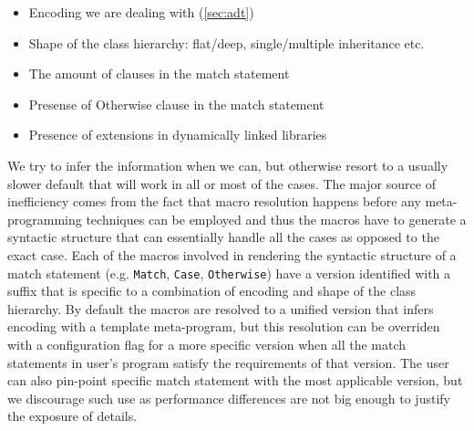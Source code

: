 \documentclass[preprint]{sigplanconf}
\makeatletter
\DeclareRobustCommand{\code}[1]{{\lstinline[breaklines=false,escapechar=@]{#1}}}
\makeatother
\begin{document}
\begin{itemize}
\setlength{\itemsep}{0pt}
\setlength{\parskip}{0pt}
\item Encoding we are dealing with (\textsection\ref{sec:adt})
\item Shape of the class hierarchy: flat/deep, single/multiple inheritance etc.
\item The amount of clauses in the match statement
\item Presense of Otherwise clause in the match statement
\item Presence of extensions in dynamically linked libraries
\end{itemize}

We try to infer the information when we can, but otherwise resort to a usually 
slower default that will work in all or most of the cases. The major source of 
inefficiency comes from the fact that macro resolution happens before any 
meta-programming techniques can be employed and thus the macros have to generate 
a syntactic structure that can essentially handle all the cases as opposed to 
the exact case. Each of the macros involved in rendering the syntactic structure 
of a match statement (e.g. \code{Match}, \code{Case}, \code{Otherwise}) have a 
version identified with a suffix that is specific to a combination of encoding 
and shape of the class hierarchy. By default the macros are resolved to a 
unified version that infers encoding with a template meta-program, but this 
resolution can be overriden with a configuration flag for a more specific 
version when all the match statements in user's program satisfy the requirements 
of that version. The user can also pin-point specific match statement with the 
most applicable version, but we discourage such use as performance differences 
are not big enough to justify the exposure of details.
\end{document}
